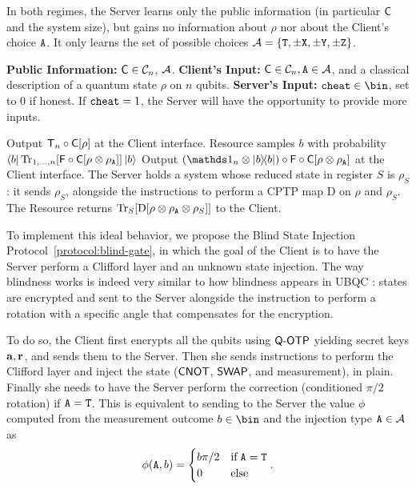 In both regimes, the Server learns only the public information (in particular $\mathsf{C}$ and the system size), but gains no information about $\rho$ nor about the Client's choice $\mathtt{A}$. It only learns the set of possible choices $\mathcal A=\{\mathtt{T}, \pm\mathtt{X},  \pm\mathtt{Y},  \pm\mathtt{Z}\}$.
\begin{resourcee}[h]
    \caption{Hidden-Magic Gate}
    \label{resource:blind-gate}
    \begin{algorithmic}[0]
        \State \textbf{Public Information:} $\mathsf{C}\in\mathcal{C}_n$, $\mathcal A$.
        \State \textbf{Client's Input:} $\mathsf{C}\in\mathcal{C}_n, \mathtt{A}\in\mathcal A$, and a classical description of a quantum state $\rho$ on $n$ qubits.
        \State \textbf{Server's Input:} $\c\in\bin$, set to $0$ if honest. If $\mathtt{cheat}=1$, the Server will have the opportunity to provide more inputs.

            \If{$\Alabel=\Tlabel$}
            \State Output $\mathsf{T}_n\circ \mathsf{C}[\rho]$ at the Client interface.
            \Else
            \State Resource samples $b$ with probability $\bra b
            \Tr_{1, ..., n}[\mathsf{F}\circ \mathsf{C}[\rho\otimes \rho_{\mathtt{A}}]]
            \ket b$
            \State Output
            $
            (\id_n\otimes \ketbra b)
            \circ
            \F\circ \C[\rho\otimes\rho_\Alabel]
            $ at the Client interface.
            \EndIf
        \Else
            \State The Server holds a system whose reduced state in register $S$ is $\rho_S$: it sends $\rho_S$, alongside the instructions to perform a CPTP map $\mathrm D$ on $\rho$ and $\rho_S$. The Resource returns $\Tr_S[\mathrm D[\rho\otimes \rho_{\mathtt{A}}\otimes \rho_S]]$ to the Client.
        \EndIf
        \EndProcedure
    \end{algorithmic}
\end{resourcee}
To implement this ideal behavior, we propose the Blind State Injection Protocol~\ref{protocol:blind-gate}, in which the goal of the Client is to have the Server perform a Clifford layer and an unknown state injection.
The way blindness works is indeed very similar to how blindness appears in UBQC \cite{BFK09universal}: states are encrypted and sent to the Server alongside the instruction to perform a rotation with a specific angle that compensates for the encryption.

To do so, the Client first encrypts all the qubits using $\textsf{Q-OTP}$ yielding secret keys $\mathbf a, \mathbf r$, and sends them to the Server. Then she
 sends instructions to perform the Clifford layer and inject the state ($\mathsf{CNOT}$,
$\mathsf{SWAP}$, and measurement), in plain. Finally she needs to have the Server perform the correction (conditioned $\pi/2$ rotation) if $\mathtt{A}=\mathtt{T}$. This is equivalent to sending to the Server the value $\phi$ computed from the measurement outcome $b\in\bin$ and the injection type $\mathtt{A}\in\mathcal A$ as
\begin{equation}
    \label{eq:blind:phi}
    \phi(\mathtt{A}, b) = \begin{cases}
        b\pi/2 &\text{if}\; \mathtt{A}=\mathtt{T}\\
        0&\text{else}\;
    \end{cases}.
\end{equation}

